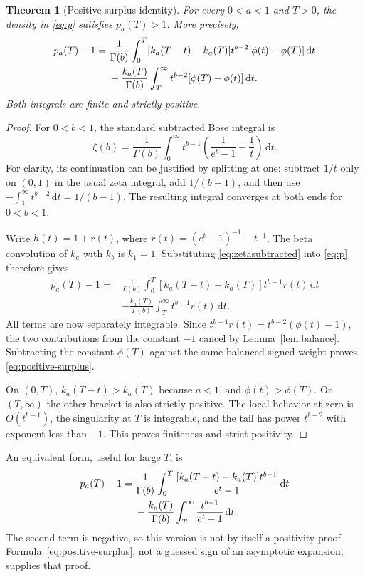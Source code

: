 \documentclass[11pt]{article}
\numberwithin{equation}{section}
\newtheorem{theorem}{Theorem}[section]
\theoremstyle{definition}\newtheorem{definition}[theorem]{Definition}
\theoremstyle{remark}\newtheorem{remark}[theorem]{Remark}
\newcommand{\dd}{\,\mathrm d}
\begin{document}
\begin{theorem}[Positive surplus identity]\label{thm:surplus}
For every $0<a<1$ and $T>0$, the density in \eqref{eq:p} satisfies
$p_a(T)>1$. More precisely,
\begin{align}\label{eq:positive-surplus}
 p_a(T)-1={}&\frac1{\Gamma(b)}
 \int_0^T[k_a(T-t)-k_a(T)]t^{b-2}
          [\phi(t)-\phi(T)]\dd t\notag\\
 &+\frac{k_a(T)}{\Gamma(b)}
 \int_T^\infty t^{b-2}[\phi(T)-\phi(t)]\dd t.
\end{align}
Both integrals are finite and strictly positive.
\end{theorem}
\begin{proof}
For $0<b<1$, the standard subtracted Bose integral is
\begin{equation}\label{eq:zetasubtracted}
 \zeta(b)=\frac1{\Gamma(b)}\int_0^\infty
 t^{b-1}\left(\frac1{e^t-1}-\frac1t\right)\dd t.
\end{equation}
For clarity, its continuation can be justified by splitting at one:
subtract $1/t$ only on $(0,1)$ in the usual zeta integral, add
$1/(b-1)$, and then use
$-\int_1^\infty t^{b-2}\dd t=1/(b-1)$.
The resulting integral converges at both ends for $0<b<1$.

Write $h(t)=1+r(t)$, where $r(t)=(e^t-1)^{-1}-t^{-1}$.
The beta convolution of $k_a$ with $k_b$ is $k_1=1$. Substituting
\eqref{eq:zetasubtracted} into \eqref{eq:p} therefore gives
\begin{align*}
 p_a(T)-1={}&\frac1{\Gamma(b)}
 \int_0^T[k_a(T-t)-k_a(T)]t^{b-1}r(t)\dd t\\
 &-\frac{k_a(T)}{\Gamma(b)}\int_T^\infty t^{b-1}r(t)\dd t.
\end{align*}
All terms are now separately integrable. Since
$t^{b-1}r(t)=t^{b-2}(\phi(t)-1)$, the two contributions from the
constant $-1$ cancel by Lemma~\ref{lem:balance}. Subtracting the
constant $\phi(T)$ against the same balanced signed weight proves
\eqref{eq:positive-surplus}.

On $(0,T)$, $k_a(T-t)>k_a(T)$ because $a<1$, and
$\phi(t)>\phi(T)$. On $(T,\infty)$ the other bracket is also strictly
positive. The local behavior at zero is $O(t^{b-1})$, the singularity
at $T$ is integrable, and the tail has power $t^{b-2}$ with exponent
less than $-1$. This proves finiteness and strict positivity.
\end{proof}

An equivalent form, useful for large $T$, is
\begin{align}\label{eq:Bose-surplus}
 p_a(T)-1={}&\frac1{\Gamma(b)}
 \int_0^T\frac{[k_a(T-t)-k_a(T)]t^{b-1}}{e^t-1}\dd t\notag\\
 &-\frac{k_a(T)}{\Gamma(b)}
 \int_T^\infty\frac{t^{b-1}}{e^t-1}\dd t.
\end{align}
The second term is negative, so this version is not by itself a
positivity proof. Formula~\eqref{eq:positive-surplus}, not a guessed sign
of an asymptotic expansion, supplies that proof.
\end{document}
